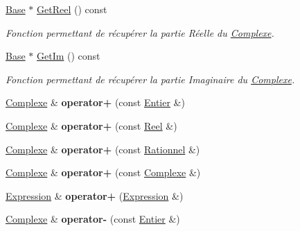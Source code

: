 \begin{DoxyCompactItemize}
\hyperlink{class_base}{Base} $\ast$ \hyperlink{class_complexe_a5f39994e59be2809629c9d9deac7539c}{Get\-Reel} () const 
\begin{DoxyCompactList}\small\item\em Fonction permettant de récupérer la partie Réelle du \hyperlink{class_complexe}{Complexe}. \end{DoxyCompactList}\item 
\hyperlink{class_base}{Base} $\ast$ \hyperlink{class_complexe_ae57b14f197af61edf80f5c0b46373a2f}{Get\-Im} () const 
\begin{DoxyCompactList}\small\item\em Fonction permettant de récupérer la partie Imaginaire du \hyperlink{class_complexe}{Complexe}. \end{DoxyCompactList}\item 
\hypertarget{class_complexe_a8f564d48149e48b0a0bbb230a6010782}{\hyperlink{class_complexe}{Complexe} \& {\bfseries operator+} (const \hyperlink{class_entier}{Entier} \&)}\label{class_complexe_a8f564d48149e48b0a0bbb230a6010782}

\item 
\hypertarget{class_complexe_a1a2eae6f18f1bd6889ea6d588db49b1f}{\hyperlink{class_complexe}{Complexe} \& {\bfseries operator+} (const \hyperlink{class_reel}{Reel} \&)}\label{class_complexe_a1a2eae6f18f1bd6889ea6d588db49b1f}

\item 
\hypertarget{class_complexe_a0a7497697ce897e1085263b06ea5b0cc}{\hyperlink{class_complexe}{Complexe} \& {\bfseries operator+} (const \hyperlink{class_rationnel}{Rationnel} \&)}\label{class_complexe_a0a7497697ce897e1085263b06ea5b0cc}

\item 
\hypertarget{class_complexe_ac868828ed2144d2ab4b4d3e924877a4d}{\hyperlink{class_complexe}{Complexe} \& {\bfseries operator+} (const \hyperlink{class_complexe}{Complexe} \&)}\label{class_complexe_ac868828ed2144d2ab4b4d3e924877a4d}

\item 
\hypertarget{class_complexe_a251362969154abd42403eea9d9a990dc}{\hyperlink{class_expression}{Expression} \& {\bfseries operator+} (\hyperlink{class_expression}{Expression} \&)}\label{class_complexe_a251362969154abd42403eea9d9a990dc}

\item 
\hypertarget{class_complexe_a2c1cb377233abdbc14bf090eaf0b1fc6}{\hyperlink{class_complexe}{Complexe} \& {\bfseries operator-\/} (const \hyperlink{class_entier}{Entier} \&)}\label{class_complexe_a2c1cb377233abdbc14bf090eaf0b1fc6}


\end{DoxyCompactItemize}
